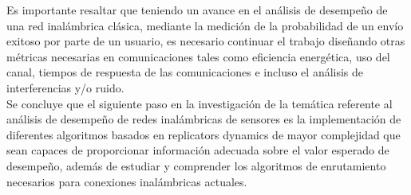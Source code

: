 \documentclass[journal]{IEEEtran}
\begin{document}
Es importante resaltar que teniendo un avance en el análisis de desempeño de una red inalámbrica clásica, mediante la medición de la probabilidad de un envío exitoso por parte de un usuario, es necesario continuar el trabajo diseñando otras métricas necesarias en comunicaciones tales como eficiencia energética, uso del canal, tiempos de respuesta de las comunicaciones e incluso el análisis de interferencias y/o ruido.\\

Se concluye que el siguiente paso en la investigación de la temática referente al análisis de desempeño de redes inalámbricas de sensores es la implementación de diferentes algoritmos basados en replicators dynamics de mayor complejidad que sean capaces de proporcionar información adecuada sobre el valor esperado de desempeño, además de estudiar y comprender los algoritmos de enrutamiento necesarios para conexiones inalámbricas actuales.\\
\end{document}

